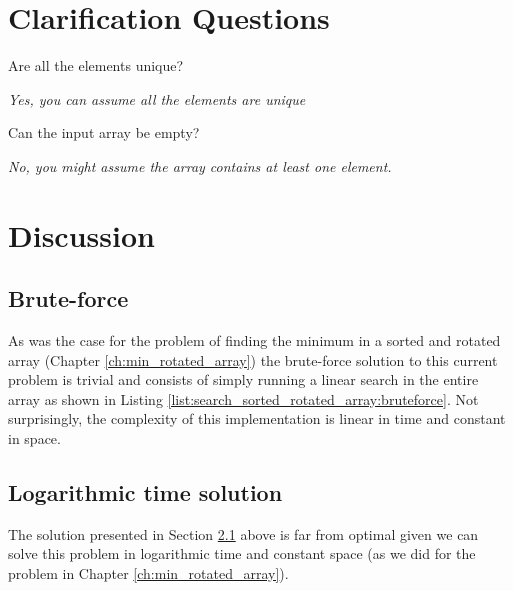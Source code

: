 \section{Clarification Questions}

\begin{QandA}
	\begin{questionitem} \begin{question} Are all the elements unique?   \end{question} 	 
    \begin{answered}
		\textit{Yes, you can assume all the elements are unique}
	\end{answered} \end{questionitem}
	\begin{questionitem} \begin{question} Can the input array be empty?  \end{question} 	 
    \begin{answered}
		\textit{No, you might assume the array contains at least one element.}
	\end{answered} \end{questionitem}
\end{QandA}


\section{Discussion}
\label{search_sorted_rotated_array:sec:discussion}


\subsection{Brute-force}
\label{search_sorted_rotated_array:sec:bruteforce}
As was the case for the problem of finding the minimum in a sorted and rotated array (Chapter \ref{ch:min_rotated_array}) the brute-force solution to this current problem is trivial and consists of simply running a linear search in the entire array as shown in Listing \ref{list:search_sorted_rotated_array:bruteforce}.
Not surprisingly, the complexity of this implementation is linear in time and constant in space.



\subsection{Logarithmic time solution}
\label{search_sorted_rotated_array:sec:log}
The solution presented in Section \ref{search_sorted_rotated_array:sec:bruteforce} above is far from optimal given we can solve this problem in logarithmic time and constant space (as we did for the problem in Chapter \ref{ch:min_rotated_array}).


